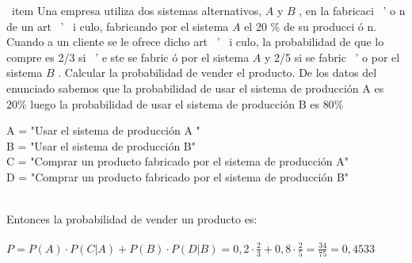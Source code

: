 \problem
\ item Una empresa utiliza dos sistemas alternativos, $ A $ y $ B $ , en la fabricaci { \ ' o} n
de un art { \ ' \ i } culo, fabricando por el sistema $ A $     el 20 \%   de su producci { \' o} n.
Cuando a un cliente se le ofrece dicho art { \ ' \ i } culo, la probabilidad de que
lo compre es 2/3 si { \ ' e} ste se fabric { \' o} por el sistema $ A $   y 2/5 si se
fabric { \ ' o} por el sistema   $ B $ . Calcular la probabilidad de vender el
producto.
{\tiny }
		De los datos del enunciado sabemos que la probabilidad de usar el sistema de producción A es  $20\%$ luego la probabilidad de usar  el sistema de producción B es  $80\%$   
		\begin{flushleft}
			A = "Usar el sistema de producción A " \\
			B = "Usar el sistema de producción B" \\
			C = "Comprar un producto fabricado por el sistema de producción A" \\
			D = "Comprar un producto fabricado por el sistema de producción B"\\  \\
		
		\end{flushleft}
		Entonces la probabilidad de vender un producto es:\\ \\
	$P = P(A) \cdot P(C|A) + P(B) \cdot P(D|B) = 0,2 \cdot\frac{2}{3} + 0,8 \cdot\frac{2}{5} = \frac{34}{75} = 0,4533 $

